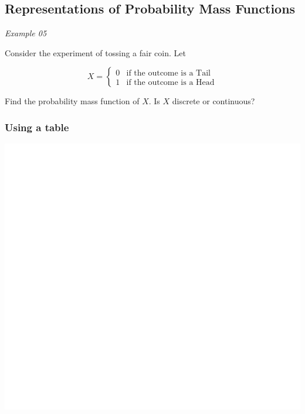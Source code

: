\documentclass[]{book}
\begin{document}
\hypertarget{representations-of-probability-mass-functions}{%
\subsection{Representations of Probability Mass Functions}\label{representations-of-probability-mass-functions}}

\emph{Example 05}

Consider the experiment of tossing a fair coin. Let

\begin{equation}
X =
\begin{cases} 
0 & \text{if the outcome is a Tail }\\
1 & \text{if the outcome is a Head}
\end{cases}
\end{equation}

Find the probability mass function of \(X\). Is \(X\) discrete or continuous?

\hypertarget{using-a-table}{%
\subsubsection{Using a table}\label{using-a-table}}

\begin{center}\includegraphics[width=1\linewidth]{figure/Ch1box5-1} \end{center}
\end{document}
